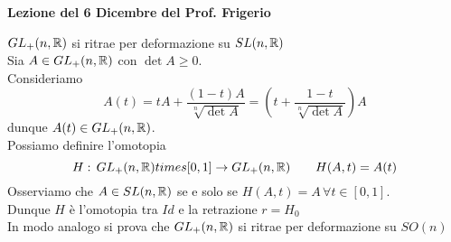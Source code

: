 

\textbf{Lezione del 6 Dicembre del Prof. Frigerio}

\begin{ese}$GL_+(n,\mathbb{R})$ si ritrae per deformazione su $SL(n,\mathbb{R})$\\
Sia $A\in  GL_+(n,\mathbb{R})$ con $\det A \geq 0$.\\
Consideriamo
$$ A(t)= tA + \frac{(1-t)A}{\sqrt[n]{\det A}} = \left( t + \frac{1-t}{\sqrt[n]{\det A}} \right)A$$ 
dunque $A(t) \in GL_+(n,\mathbb{R})$.\\
Possiamo definire l'omotopia
$$ H :\, GL_+(n,\mathbb{R}) \\times [0,1] \to GL_+(n,\mathbb{R}) \qquad H(A,t)=A(t)$$
Osserviamo che $A\in SL(n, \mathbb{R})$ se e solo se $H(A,t)=A  \, \forall t \in [0,1]$.\\
Dunque $H$ \`e l'omotopia tra $Id$ e la retrazione $r=H_0$\\
In modo analogo si prova che $GL_+(n, \mathbb{R})$ si ritrae per deformazione su $SO(n)$
\end{ese}

